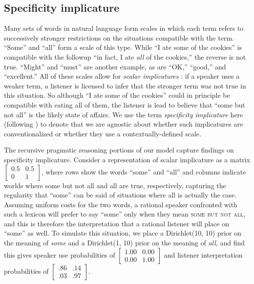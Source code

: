 \documentclass{article} %
\begin{document}


\subsection{Specificity implicature}

Many sets of words in natural language form scales in which each term
refers to successively stronger restrictions on the situations
compatible with the term. ``Some'' and ``all'' form a scale of this
type. While ``I ate some of the cookies'' is compatible with the
followup ``in fact, I ate {\it all} of the cookies,'' the reverse is
not true. ``Might'' and ``must'' are another example, as are ``OK,''
``good,'' and ``excellent.'' All of these scales allow for {\it scalar
  implicatures} \cite{grice1975}: if a speaker uses a weaker term, a
listener is licensed to infer that the stronger term was not true in
this situation. So although ``I ate some of the cookies'' could in
principle be compatible with eating all of them, the listener is lead
to believe that ``some but not all'' is the likely state of
affairs. We use the term {\it specificity implicature} here (following
\cite{bergen2012}) to denote that we are agnostic about whether such
implicatures are conventionalized or whether they use a
contextually-defined scale.

The recursive pragmatic reasoning portions of our model capture
findings on specificity implicature. Consider a representation of
scalar implicature as a matrix $\left[
    \begin{array}{cc}
      0.5 & 0.5 \\
      0 & 1
    \end{array}
  \right]$, where rows show the words ``some'' and ``all'' and columns
  indicate worlds where {\sc some but not all} and {\sc all} are true,
  respectively, capturing the regularity that ``some'' can be said of
  situations where {\sc all} is actually the case. Assuming uniform
  costs for the two words, a rational speaker confronted with such a
  lexicon will prefer to say ``some'' only when they mean \textsc{some
    but not all}, and this is therefore the interpretation that a
  rational listener will place on ``some'' as well. To simulate this
  situation, we place a Dirichlet(10, 10) prior on the meaning of
  \textit{some} and a Dirichlet(1, 10) prior on the meaning of
  \textit{all}, and find this gives speaker use probabilities of
  $\left[
    \begin{array}{cc}
      1.00 & 0.00 \\
      0.00 & 1.00
    \end{array}
  \right]$
and listener interpretation probabilities of
$\left[
    \begin{array}{cc}
      .86 & .14 \\
      .03 & .97
    \end{array}
  \right]$.
\end{document}
